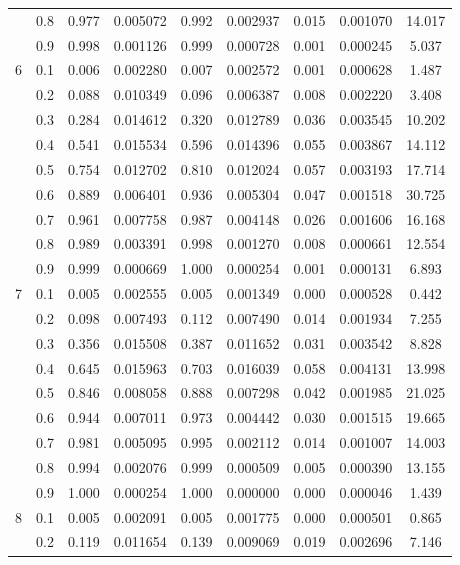 \begin{longtable}{ | c | c || c | c | c | c | c | c | c | }
 & 0.8 & 0.977 & 0.005072 & 0.992 & 0.002937 & 0.015 & 0.001070 & 14.017 \\
 & 0.9 & 0.998 & 0.001126 & 0.999 & 0.000728 & 0.001 & 0.000245 & 5.037 \\
 \hline
\multirow{9}{*}{6} & 0.1 & 0.006 & 0.002280 & 0.007 & 0.002572 & 0.001 & 0.000628 & 1.487 \\
 & 0.2 & 0.088 & 0.010349 & 0.096 & 0.006387 & 0.008 & 0.002220 & 3.408 \\
 & 0.3 & 0.284 & 0.014612 & 0.320 & 0.012789 & 0.036 & 0.003545 & 10.202 \\
 & 0.4 & 0.541 & 0.015534 & 0.596 & 0.014396 & 0.055 & 0.003867 & 14.112 \\
 & 0.5 & 0.754 & 0.012702 & 0.810 & 0.012024 & 0.057 & 0.003193 & 17.714 \\
 & 0.6 & 0.889 & 0.006401 & 0.936 & 0.005304 & 0.047 & 0.001518 & 30.725 \\
 & 0.7 & 0.961 & 0.007758 & 0.987 & 0.004148 & 0.026 & 0.001606 & 16.168 \\
 & 0.8 & 0.989 & 0.003391 & 0.998 & 0.001270 & 0.008 & 0.000661 & 12.554 \\
 & 0.9 & 0.999 & 0.000669 & 1.000 & 0.000254 & 0.001 & 0.000131 & 6.893 \\
 \hline
\multirow{9}{*}{7} & 0.1 & 0.005 & 0.002555 & 0.005 & 0.001349 & 0.000 & 0.000528 & 0.442 \\
 & 0.2 & 0.098 & 0.007493 & 0.112 & 0.007490 & 0.014 & 0.001934 & 7.255 \\
 & 0.3 & 0.356 & 0.015508 & 0.387 & 0.011652 & 0.031 & 0.003542 & 8.828 \\
 & 0.4 & 0.645 & 0.015963 & 0.703 & 0.016039 & 0.058 & 0.004131 & 13.998 \\
 & 0.5 & 0.846 & 0.008058 & 0.888 & 0.007298 & 0.042 & 0.001985 & 21.025 \\
 & 0.6 & 0.944 & 0.007011 & 0.973 & 0.004442 & 0.030 & 0.001515 & 19.665 \\
 & 0.7 & 0.981 & 0.005095 & 0.995 & 0.002112 & 0.014 & 0.001007 & 14.003 \\
 & 0.8 & 0.994 & 0.002076 & 0.999 & 0.000509 & 0.005 & 0.000390 & 13.155 \\
 & 0.9 & 1.000 & 0.000254 & 1.000 & 0.000000 & 0.000 & 0.000046 & 1.439 \\
 \hline
\multirow{9}{*}{8} & 0.1 & 0.005 & 0.002091 & 0.005 & 0.001775 & 0.000 & 0.000501 & 0.865 \\
 & 0.2 & 0.119 & 0.011654 & 0.139 & 0.009069 & 0.019 & 0.002696 & 7.146 \\

\end{longtable}
